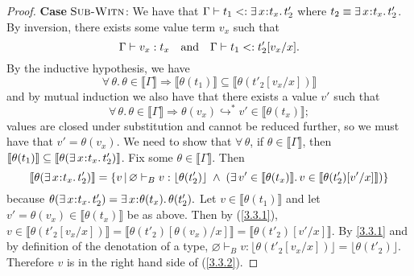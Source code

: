 \documentclass[11pt]{article}
\newcommand{\bind}{\hspace{0.05em}{:}\hspace{0.05em}} %
\newcommand{\lb}{\llbracket}         %
\newcommand{\rb}{\rrbracket}         %
\newcommand{\many}{\hookrightarrow^*}
\begin{document}
\begin{proof}
{\bf Case} $\textsc{Sub-Witn}$: We have that
$\Gamma \vdash t_1 <: \exists\, x\bind t_x.\, t'_2$ where $t_2 \equiv \exists\, x\bind t_x.\, t'_2$. By inversion, there exists some value term $v_x$ such that
\[
\Gamma \vdash v_x : t_x \quad {\rm and} \quad \Gamma \vdash t_1 <: t'_2[v_x/x].
\]
By the inductive hypothesis, we have 
\begin{equation}\label{3.3.1}
\forall\, \theta.\, \theta\in \lb\Gamma\rb \Rightarrow \lb \theta(t_1) \rb \subseteq \lb \theta(t'_2[v_x/x]) \rb 
\end{equation}
and by mutual induction we also have that there exists a value $v'$ such that
\[
\forall\, \theta.\, \theta\in \lb\Gamma\rb \Rightarrow \theta(v_x) \many v' \in \lb\theta(t_x)\rb;
\]
values are closed under substitution and cannot be reduced further, so we must have that $v' = \theta(v_x)$.
We need to show that $\forall\, \theta$, if $\theta \in \lb\Gamma\rb$, then $\lb\theta(t_1)\rb \subseteq \lb \theta(\exists\, x\bind t_x.\, t'_2)\rb$. Fix some $\theta \in \lb\Gamma\rb.$ Then
\begin{equation} \label{3.3.2}
\lb \theta(\exists\, x\bind t_x.\, t'_2)\rb
= \{ v \,|\, \varnothing \vdash_B v : \lfloor \theta(t'_2)\rfloor \;\wedge\; 
  (\exists\, v' \in \lb \theta(t_x)\rb.\, v \in\lb \theta(t'_2)[v'/x]\rb)\}
\end{equation}
because $\theta(\exists\, x\bind t_x.\, t'_2) = \exists\, x\bind\theta(t_x).\, \theta(t'_2).$
Let $v \in \lb\theta(t_1)\rb$ and let $v' = \theta(v_x) \in \lb\theta(t_x)\rb$ be as above.
Then by (\ref{3.3.1}), $v \in \lb\theta(t'_2[v_x/x])\rb = \lb\theta(t'_2)[\theta(v_x)/x]\rb = \lb\theta(t'_2)[v'/x]\rb$.
By \ref{3.3.1} and by definition of the denotation of a type, $\varnothing \vdash_B v : \lfloor \theta(t'_2[v_x/x])\rfloor = \lfloor\theta(t'_2)\rfloor$. Therefore $v$ is in the right hand side of (\ref{3.3.2}).


\end{proof}
\end{document}
